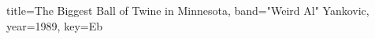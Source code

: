 \documentclass{skrul-leadsheet}
\begin{document}
\begin{song}[transpose-capo=true]{title={The Biggest Ball of Twine in Minnesota}, band={"Weird Al" Yankovic}, year={1989}, key={Eb}}



\end{song}
\end{document}

